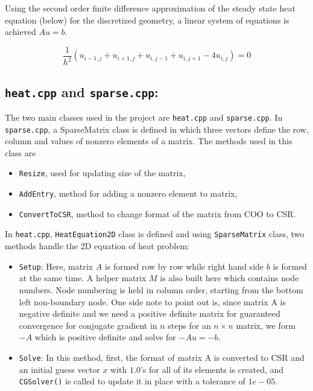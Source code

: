 \documentclass[10pt]{article}
\begin{document}
Using the second order finite difference approximation of the steady state heat equation (below) for the discretized geometry, a linear system of equations is achieved $Au=b$.

$$\frac{1}{h^{2}}\left(u_{i-1, j}+u_{i+1, j}+u_{i, j-1}+u_{i, j+1}-4 u_{i, j}\right)=0$$

\subsection*{\texttt{heat.cpp} and \texttt{sparse.cpp}:}

The two main classes used in the project are \texttt{heat.cpp} and \texttt{sparse.cpp}. In \texttt{sparse.cpp}, a SparseMatrix class is defined in which three vectors define the row, column and values of nonzero elements of a matrix. The methods used in this class are

\begin{itemize}
    \item \texttt{Resize}, used for updating size of the matrix,
    \item \texttt{AddEntry}, method for adding a nonzero element to matrix,
    \item  \texttt{ConvertToCSR}, method to change format of the matrix from COO to CSR.
\end{itemize}

In \texttt{heat.cpp}, \texttt{HeatEquation2D} class is defined and using \texttt{SparseMatrix} class, two methods handle the 2D equation of heat problem:

\begin{itemize}
    \item \texttt{Setup}: Here, matrix $A$ is formed row by row while right hand side $b$ is formed at the same time. A helper matrix $M$ is also built here which contains node numbers. Node numbering is held in column order, starting from the bottom left non-boundary node. One side note to point out is, since matrix A is negative definite and we need a positive definite matrix for guaranteed convergence for conjugate gradient in $n$ steps for an $n\times n$ matrix, we form $-A$ which is positive definite and solve for $-Au=-b$.
    \item \texttt{Solve}: In this method, first, the format of matrix A is converted to CSR and an initial guess vector $x$ with $1.0$'s for all of its elements is created, and \texttt{CGSolver()} is called to update it in place with a tolerance of $1e-05$.
\end{itemize}
\end{document}
